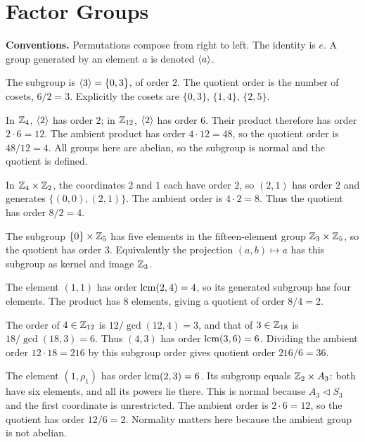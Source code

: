 \section{Factor Groups}
\textbf{Conventions.} Permutations compose from right to left. The identity is $e$. A group generated by an element $a$ is denoted $\langle a\rangle$.

The subgroup is $\langle 3\rangle=\{0,3\}$, of order $2$. The quotient order is the number of cosets, $6/2=3$. Explicitly the cosets are $\{0,3\}$, $\{1,4\}$, $\{2,5\}$.

In $\mathbb{Z}_4$, $\langle 2\rangle$ has order $2$; in $\mathbb{Z}_{12}$, $\langle 2\rangle$ has order $6$. Their product therefore has order $2\cdot6=12$. The ambient product has order $4\cdot12=48$, so the quotient order is $48/12=4$. All groups here are abelian, so the subgroup is normal and the quotient is defined.

In $\mathbb{Z}_4\times\mathbb{Z}_2$, the coordinates $2$ and $1$ each have order $2$, so $(2,1)$ has order $2$ and generates $\{(0,0),(2,1)\}$. The ambient order is $4\cdot2=8$. Thus the quotient has order $8/2=4$.

The subgroup $\{0\}\times\mathbb{Z}_5$ has five elements in the fifteen-element group $\mathbb{Z}_3\times\mathbb{Z}_5$, so the quotient has order $3$. Equivalently the projection $(a,b)\mapsto a$ has this subgroup as kernel and image $\mathbb{Z}_3$.

The element $(1,1)$ has order $\operatorname{lcm}(2,4)=4$, so its generated subgroup has four elements. The product has $8$ elements, giving a quotient of order $8/4=2$.

The order of $4\in\mathbb{Z}_{12}$ is $12/\gcd(12,4)=3$, and that of $3\in\mathbb{Z}_{18}$ is $18/\gcd(18,3)=6$. Thus $(4,3)$ has order $\operatorname{lcm}(3,6)=6$. Dividing the ambient order $12\cdot18=216$ by this subgroup order gives quotient order $216/6=36$.

The element $(1,\rho_1)$ has order $\operatorname{lcm}(2,3)=6$. Its subgroup equals $\mathbb{Z}_2\times A_3$: both have six elements, and all its powers lie there. This is normal because $A_3\triangleleft S_3$ and the first coordinate is unrestricted. The ambient order is $2\cdot6=12$, so the quotient has order $12/6=2$. Normality matters here because the ambient group is not abelian.

